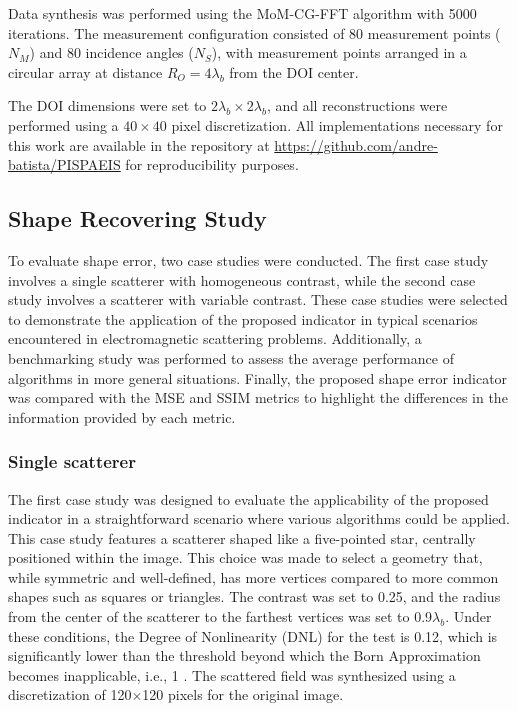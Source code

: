 \documentclass{ieeeaccess}
\begin{document}
    Data synthesis was performed using the MoM-CG-FFT algorithm \cite{su1987calculation} with 5000 iterations. The measurement configuration consisted of 80 measurement points ($N_M$) and 80 incidence angles ($N_S$), with measurement points arranged in a circular array at distance $R_O = 4\lambda_b$ from the DOI center. 

    The DOI dimensions were set to $2\lambda_b \times 2\lambda_b$, and all reconstructions were performed using a $40 \times 40$ pixel discretization. All implementations necessary for this work are available in the repository at \url{https://github.com/andre-batista/PISPAEIS} for reproducibility purposes.

    \subsection{Shape Recovering Study}\label{sec:results:shape}

        To evaluate shape error, two case studies were conducted. The first case study involves a single scatterer with homogeneous contrast, while the second case study involves a scatterer with variable contrast. These case studies were selected to demonstrate the application of the proposed indicator in typical scenarios encountered in electromagnetic scattering problems. Additionally, a benchmarking study was performed to assess the average performance of algorithms in more general situations. Finally, the proposed shape error indicator was compared with the MSE and SSIM metrics to highlight the differences in the information provided by each metric.

        \subsubsection{Single scatterer}\label{sec:results:shape:star}

            The first case study was designed to evaluate the applicability of the proposed indicator in a straightforward scenario where various algorithms could be applied. This case study features a scatterer shaped like a five-pointed star, centrally positioned within the image. This choice was made to select a geometry that, while symmetric and well-defined, has more vertices compared to more common shapes such as squares or triangles. The contrast was set to 0.25, and the radius from the center of the scatterer to the farthest vertices was set to 0.9$\lambda_b$. Under these conditions, the Degree of Nonlinearity (DNL) for the test is 0.12, which is significantly lower than the threshold beyond which the Born Approximation becomes inapplicable, i.e., 1 \cite{bucci2001degree}. The scattered field was synthesized using a discretization of 120$\times$120 pixels for the original image.
\end{document}
